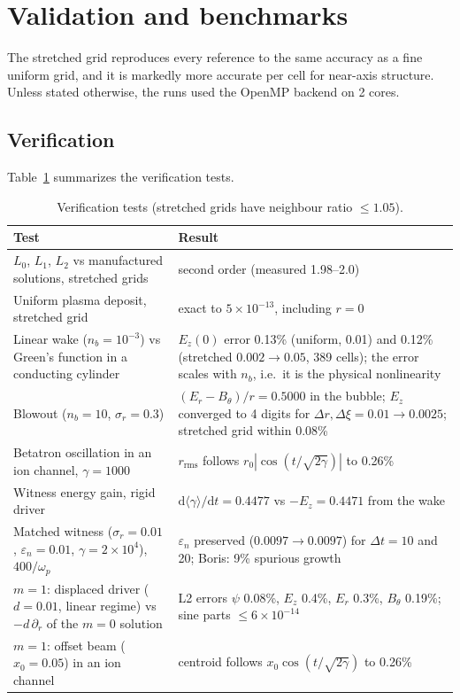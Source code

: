 \documentclass[aps,prab,reprint,floatfix,superscriptaddress,amsmath,amssymb]{revtex4-2}
\newcommand{\dd}{\mathrm{d}}
\begin{document}
\section{Validation and benchmarks}\label{sec:valid}

The stretched grid reproduces every reference to the same accuracy as a fine uniform grid, and it is markedly more accurate per cell for near-axis structure. Unless stated otherwise, the runs used the OpenMP backend on 2 cores.

\subsection{Verification}

Table~\ref{tab:verif} summarizes the verification tests.

\begin{table}[t]
\caption{Verification tests (stretched grids have neighbour ratio $\le1.05$).}
\label{tab:verif}
\begin{ruledtabular}
\begin{tabular}{p{}p{}}
Test & Result \\ \hline
$L_0$, $L_1$, $L_2$ vs manufactured solutions, stretched grids & second order (measured 1.98--2.0) \\
Uniform plasma deposit, stretched grid & exact to $5\times10^{-13}$, including $r=0$ \\
Linear wake ($n_b=10^{-3}$) vs Green's function in a conducting cylinder & $E_z(0)$ error 0.13\% (uniform, 0.01) and 0.12\% (stretched $0.002\to0.05$, 389 cells); the error scales with $n_b$, i.e.\ it is the physical nonlinearity \\
Blowout ($n_b=10$, $\sigma_r=0.3$) & $(E_r-B_\theta)/r = 0.5000$ in the bubble; $E_z$ converged to 4 digits for $\Delta r,\Delta\xi = 0.01\to0.0025$; stretched grid within 0.08\% \\
Betatron oscillation in an ion channel, $\gamma=1000$ & $r_\mathrm{rms}$ follows $r_0|\cos(t/\sqrt{2\gamma})|$ to 0.26\% \\
Witness energy gain, rigid driver & $\dd\langle\gamma\rangle/\dd t = 0.4477$ vs $-E_z = 0.4471$ from the wake \\
Matched witness ($\sigma_r=0.01$, $\varepsilon_n=0.01$, $\gamma=2\times10^4$), $400/\omega_p$ & $\varepsilon_n$ preserved ($0.0097\to0.0097$) for $\Delta t = 10$ and 20; Boris: 9\% spurious growth \\
$m=1$: displaced driver ($d=0.01$, linear regime) vs $-d\,\partial_r$ of the $m=0$ solution & L2 errors $\psi$ 0.08\%, $E_z$ 0.4\%, $E_r$ 0.3\%, $B_\theta$ 0.19\%; sine parts $\le 6\times10^{-14}$ \\
$m=1$: offset beam ($x_0=0.05$) in an ion channel & centroid follows $x_0\cos(t/\sqrt{2\gamma})$ to 0.26\% \\
\end{tabular}
\end{ruledtabular}
\end{table}
\end{document}
